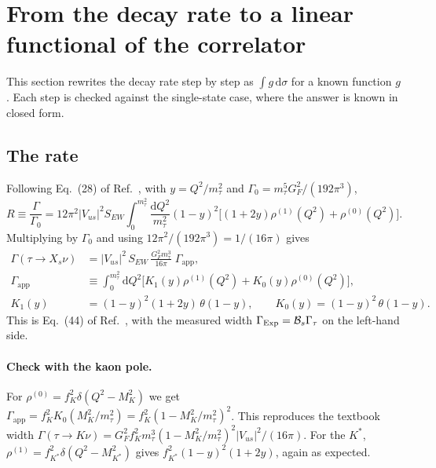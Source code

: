 \documentclass[11pt]{article}
\newcommand{\dd}{\mathrm{d}}
\newcommand{\Vus}{|V_{us}|}
\newcommand{\Gapp}{\Gamma_{\mathrm{app}}}
\newcommand{\BR}{\mathcal{B}}
\theoremstyle{remark}
\begin{document}
\section{From the decay rate to a linear functional of the correlator}\label{sec:setup}
This section rewrites the decay rate step by step as $\int g\,\dd\sigma$ for a known function $g$. Each step is checked against the single-state case, where the answer is known in closed form.

\subsection{The rate}
Following Eq.~(28) of Ref.~\cite{Chen:TauNote}, with $y=Q^2/m_\tau^2$ and $\Gamma_0=m_\tau^5G_F^2/(192\pi^3)$,
\begin{equation}
 R\equiv\frac{\Gamma}{\Gamma_0}=12\pi^2|V_{us}|^2S_{EW}\int_0^{m_\tau^2}\frac{\dd Q^2}{m_\tau^2}(1-y)^2\Big[(1+2y)\rho^{(1)}(Q^2)+\rho^{(0)}(Q^2)\Big].
\end{equation}
Multiplying by $\Gamma_0$ and using $12\pi^2/(192\pi^3)=1/(16\pi)$ gives
\begin{align}
 \Gamma(\tau\to X_s\nu)&=\Vus^2\,S_{EW}\,\frac{G_F^2m_\tau^3}{16\pi}\;\Gapp,\\
 \Gapp&\equiv\int_0^{m_\tau^2}\dd Q^2\Big[K_1(y)\rho^{(1)}(Q^2)+K_0(y)\rho^{(0)}(Q^2)\Big],\\
 K_1(y)&=(1-y)^2(1+2y)\,\theta(1-y),\qquad K_0(y)=(1-y)^2\,\theta(1-y).
\end{align}
This is Eq.~(44) of Ref.~\cite{Chen:TauNote}, with the measured width $\Gamma_{\rm Exp}=\BR_s\Gamma_\tau$ on the left-hand side.

\paragraph{Check with the kaon pole.} For $\rho^{(0)}=f_K^2\delta(Q^2-M_K^2)$ we get
$\Gapp=f_K^2K_0(M_K^2/m_\tau^2)=f_K^2(1-M_K^2/m_\tau^2)^2$. This reproduces the textbook width
$\Gamma(\tau\to K\nu)=G_F^2f_K^2m_\tau^3(1-M_K^2/m_\tau^2)^2|V_{us}|^2/(16\pi)$.
For the $K^*$, $\rho^{(1)}=f_{K^*}^2\delta(Q^2-M_{K^*}^2)$ gives $f_{K^*}^2(1-y)^2(1+2y)$, again as expected.
\end{document}
